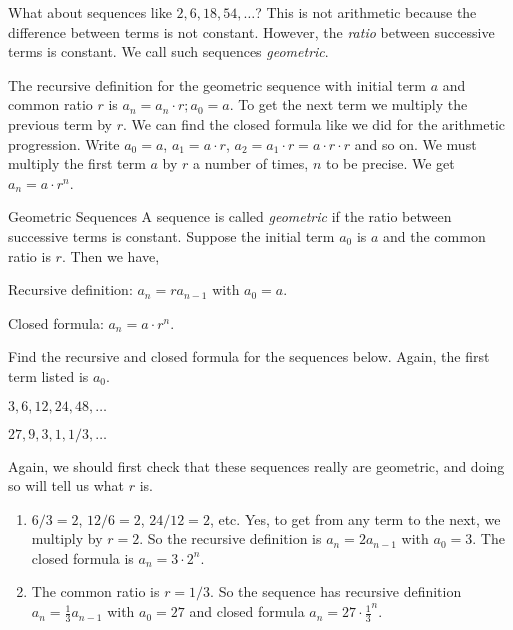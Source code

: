 \documentclass[12pt]{article}
\begin{document}
What about sequences like $2, 6, 18, 54, \ldots$?  This is not arithmetic because the difference between terms is not constant.  However, the {\em ratio} between successive terms is constant.  We call such sequences {\em geometric}.

The recursive definition for the geometric sequence with initial term $a$ and common ratio $r$ is
$a_n = a_{n}\cdot r; a_0 = a$.
To get the next term we multiply the previous term by $r$.  We can find the closed formula like we did for the arithmetic progression.  Write $a_0 = a$, $a_1 = a\cdot r$, $a_2 = a_1 \cdot r = a\cdot r \cdot r$ and so on.  We must multiply the first term $a$ by $r$ a number of times, $n$ to be precise.  We get $a_n = a\cdot r^{n}$.

\begin{defbox}{Geometric Sequences}
  A sequence is called {\em geometric} if the ratio between successive terms is constant.
  Suppose the initial term $a_0$ is $a$ and the common ratio is $r$.  Then we have,

  Recursive definition: $a_n = ra_{n-1}$ with $a_0 = a$.

  Closed formula: $a_n = a\cdot r^{n}$.
\end{defbox}


\begin{example}
  Find the recursive and closed formula for the sequences below.  Again, the first term listed is $a_0$.
  \begin{enumerate}
  \begin{multicols}{2}
    \item $3, 6, 12, 24, 48, \ldots$
    \item $27, 9, 3, 1, 1/3, \ldots$
    \end{multicols}
  \end{enumerate}
  \begin{solution}
    Again, we should first check that these sequences really are geometric, and doing so will tell us what $r$ is.
    \begin{enumerate}
      \item $6/3 = 2$, $12/6 = 2$, $24/12 = 2$, etc.  Yes, to get from any term to the next, we multiply by $r = 2$.  So the recursive definition is $a_n = 2a_{n-1}$ with $a_0 = 3$.  The closed formula is $a_n = 3\cdot 2^{n}$.
      \item The common ratio is $r = 1/3$.  So the sequence has recursive definition $a_n = \frac{1}{3}a_{n-1}$ with $a_0 = 27$ and closed formula $a_n = 27\cdot \frac{1}{3}^{n}$.
    \end{enumerate}
  \end{solution}
\end{example}
\end{document}
